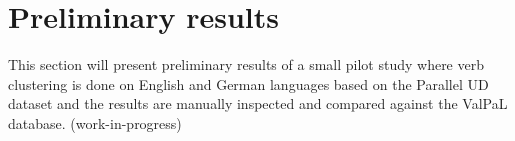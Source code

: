 \section{Preliminary results}

This section will present preliminary results of a small pilot study where verb clustering is done on English and German languages based on the Parallel UD dataset and the results are manually inspected and compared against the ValPaL database. (work-in-progress)